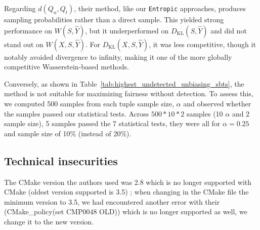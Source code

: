\documentclass[runningheads, orivec]{llncs}
\newcommand{\KL}{D_{\mathrm{KL}}}
\begin{document}
Regarding $d(Q_n, Q_t)$, their method, like our \texttt{Entropic} approaches, produces sampling probabilities rather than a direct sample. This yielded strong performance on $W(S,\widehat{Y})$, but it underperformed on $\KL(S,\widehat{Y})$ and did not stand out on $W(X,S,\widehat{Y})$. For $\KL(X,S,\widehat{Y})$, it was less competitive, though it notably avoided divergence to infinity, making it one of the more globally competitive Wasserstein-based methods.

\begin{table}[tb!!]
 \centering
 \caption{Highest undetected achievable Disparate Impact for the Adult dataset, for each sample size (S Size) and fairwashing method. The symbol -- indicates that some methods couldn't reach a DI improvement. To emphasize the best method to use in order to deceive the auditor, we put the DI achieved in bold when one or two over-performed the others. We remind that the original DI of our Adult dataset is $0.30$.}
  \label{tab:highest_undetected_unbiasing_sbts}
\end{table}

Conversely, as shown in Table~\ref{tab:highest_undetected_unbiasing_sbts}, the method is not suitable for maximizing fairness without detection. To assess this, we computed 500 samples from each tuple sample size, $\alpha$ and observed whether the samples passed our statistical tests. Across $500*10*2$ samples (10 $\alpha$ and 2 sample size), 5 samples passed the 7 statistical tests, they were all for $\alpha = 0.25$ and sample size of 10\% (instead of 20\%). 

\subsection{Technical insecurities}

The CMake version the authors used was 2.8 which is no longer supported with CMake (oldest version supported is 3.5) ; when changing in the CMake file the minimum version to 3.5, we had encountered another error with their (CMake\_policy(set CMP0048 OLD)) which is no longer supported as well, we change it to the new version. 
\end{document}
